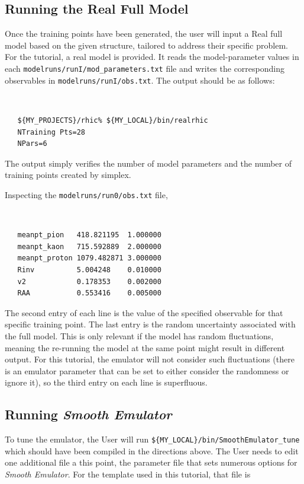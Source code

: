 \documentclass[UserManual.tex]{subfiles}
\begin{document}
\subsection{Running the Real Full Model}
Once the training points have been generated, the user will input a Real full model based on the given structure, tailored to address their specific problem. For the tutorial, a real model is provided. It reads the model-parameter values in each {\tt modelruns/runI/mod\_parameters.txt} file and writes the corresponding observables in {\tt modelruns/runI/obs.txt}. The output should be as follows:
{\tt
\begin{verbatim}
   ${MY_PROJECTS}/rhic% ${MY_LOCAL}/bin/realrhic
   NTraining Pts=28
   NPars=6
\end{verbatim}
}
The output simply verifies the number of model parameters and the number of training points created by simplex.

Inspecting the {\tt modelruns/run0/obs.txt} file,
{\tt
\begin{verbatim}
   meanpt_pion   418.821195  1.000000
   meanpt_kaon   715.592889  2.000000
   meanpt_proton 1079.482871 3.000000
   Rinv          5.004248    0.010000
   v2            0.178353    0.002000
   RAA           0.553416    0.005000
\end{verbatim}
}
The second entry of each line is the value of the specified observable for that specific training point. The last entry is the random uncertainty associated with the full model. This is only relevant if the model has random fluctuations, meaning the re-running the model at the same point might result in different output. For this tutorial, the emulator will not consider such fluctuations (there is an emulator parameter that can be set to either consider the randomness or ignore it), so the third entry on each line is superfluous.

\subsection{Running {\it Smooth Emulator}}
To tune the emulator, the User will run {\tt \$\{MY\_LOCAL\}/bin/SmoothEmulator\_tune} which should have been compiled in the directions above. The User needs to edit one additional file a this point, the parameter file that sets numerous options for {\it Smooth Emulator}. For the template used in this tutorial, that file is
\end{document}
